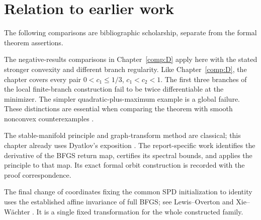 \endgroup


\section*{Relation to earlier work}
The following comparisons are bibliographic scholarship, separate from the formal theorem assertions.

The negative-results comparisons in Chapter~\ref{comp:D} apply here with the stated stronger convexity and different branch regularity. Like Chapter~\ref{comp:D}, the chapter covers every pair $0<c_1\le1/3$, $c_1<c_2<1$. The first three branches of the local finite-branch construction fail to be twice differentiable at the minimizer. The simpler quadratic-plus-maximum example is a global failure. These distinctions are essential when comparing the theorem with smooth nonconvex counterexamples \cite{NEG_M07,NEG_M14,NEG_DIAO26}.

The stable-manifold principle and graph-transform method are classical; this chapter already uses Dyatlov's exposition \cite[Sections 3--4]{DY}. The report-specific work identifies the derivative of the BFGS return map, certifies its spectral bounds, and applies the principle to that map. Its exact formal orbit construction is recorded with the proof correspondence.

The final change of coordinates fixing the common SPD initialization to identity uses the established affine invariance of full BFGS; see Lewis--Overton \cite[Section 2]{LO} and Xie--W\"achter \cite[Theorem II.1]{XW}. It is a single fixed transformation for the whole constructed family.
